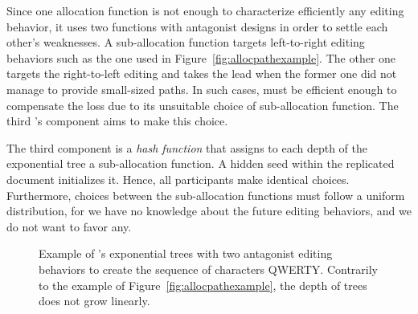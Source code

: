 Since one allocation function is not enough to characterize efficiently any
editing behavior, it uses two functions with antagonist designs in order to
settle each other's weaknesses. A sub-allocation function targets left-to-right
editing behaviors such as the one used in Figure~\ref{fig:allocpathexample}. The
other one targets the right-to-left editing and takes the lead when the former
one did not manage to provide small-sized paths. In such cases, \LSEQ must be
efficient enough to compensate the loss due to its unsuitable choice of
sub-allocation function. The third \LSEQ's component aims to make this
choice.

The third component is a \emph{hash function} that assigns to each depth of the
exponential tree a sub-allocation function.  A hidden seed within the replicated
document initializes it. Hence, all participants make identical
choices. Furthermore, choices between the sub-allocation functions must follow a
uniform distribution, for we have no knowledge about the future editing
behaviors, and we do not want to favor any.





\begin{figure}
  \centering
  \caption{\label{fig:lseqtreeexample} Example of \LSEQ's exponential trees with
    two antagonist editing behaviors to create the sequence of characters
    QWERTY. Contrarily to the example of Figure~\ref{fig:allocpathexample}, the
    depth of trees does not grow linearly.}
\end{figure}


